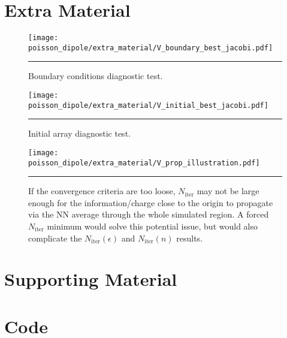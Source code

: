 \documentclass[notitlepage,aps,prd,nofootinbib]{revtex4-1}
\begin{document}
\clearpage
\section{Extra Material}
\label{sec:Extra_Material}

\begin{figure}[!htbc]
  \centering
  \texttt{[image: poisson\_dipole/extra\_material/V\_boundary\_best\_jacobi.pdf]}
	{\par\nobreak\rule[9pt]{35em}{0.5pt}\vspace{-5mm}}
	\caption{Boundary conditions diagnostic test.}
	\label{fig:boundary_test}
\end{figure}

\begin{figure}[!htbc]
  \centering
  \texttt{[image: poisson\_dipole/extra\_material/V\_initial\_best\_jacobi.pdf]}
	{\par\nobreak\rule[9pt]{35em}{0.5pt}\vspace{-5mm}}
	\caption{Initial array diagnostic test.}
	\label{fig:initial_array_test}
\end{figure}

\clearpage
\begin{figure}[!htbc]
  \centering
  \texttt{[image: poisson\_dipole/extra\_material/V\_prop\_illustration.pdf]}
	{\par\nobreak\rule[9pt]{35em}{0.5pt}\vspace{-5mm}}
	\caption{If the convergence criteria are too loose, $N_{\mathrm{iter}}$ may not be large enough for the information/charge close to the origin to propagate via the NN average through the whole simulated region. A forced $N_{\mathrm{iter}}$ minimum would solve this potential issue, but would also complicate the $N_{\mathrm{iter}}\left(\epsilon\right)$ and $N_{\mathrm{iter}}\left(n\right)$ results.}
	\label{fig:propegation_test}
\end{figure}


\clearpage
\section{Supporting Material}
\label{sec:Supporting_Material}


\clearpage


\clearpage



\clearpage
\section{Code}
\label{sec:code}

% 
% 
\end{document}
